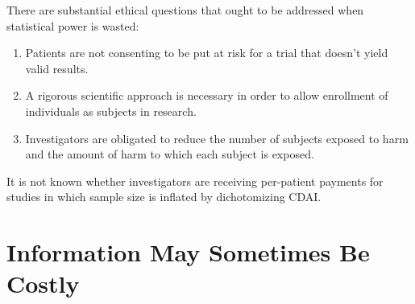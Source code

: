 There are substantial ethical questions that ought to be addressed
when statistical power is wasted:
\begin{enumerate}
\item Patients are not consenting to be put at risk for a trial that
  doesn't yield valid results.
\item A rigorous scientific approach is necessary in order to allow
  enrollment of individuals as subjects in research.
\item Investigators are obligated to reduce the number of subjects
  exposed to harm and the amount of harm to which each subject is
  exposed.
\end{enumerate}
It is not known whether investigators are receiving per-patient
payments for studies in which sample size is inflated by dichotomizing
CDAI.

\section{Information May Sometimes Be Costly}

\nocite{bor07sta,bri08ski,vic08dec}
\vspace{-2in}
{\smaller[3]}
